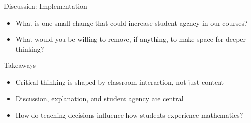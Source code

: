 \documentclass[dvipsnames]{beamer}
\begin{document}

\begin{frame}{Discussion: Implementation}
\begin{itemize}
    \item What is one small change that could increase student agency in our courses?
    \item What would you be willing to remove, if anything, to make space for deeper thinking?
\end{itemize}
\end{frame}


\begin{frame}{Takeaways}
\begin{itemize}
    \item Critical thinking is shaped by classroom interaction, not just content
    \item Discussion, explanation, and student agency are central
    \item How do teaching decisions influence how students experience mathematics?
\end{itemize}
\end{frame}




\end{document}
